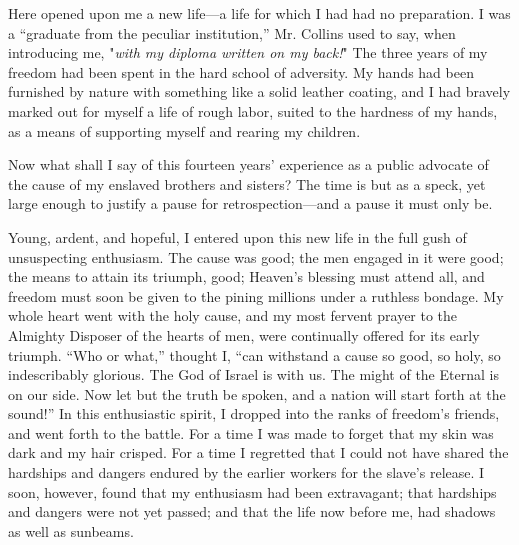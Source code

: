 Here opened upon me a new life---a life for which I had had no
preparation. I was a ``graduate from the peculiar institution,'' Mr.
Collins used to say, when introducing me, "\emph{with my diploma written
on my back!}" The three years of my freedom had been spent in the hard
school of adversity. My hands had been furnished by nature with
something like a solid leather coating, and I had bravely marked out for
myself a life of rough labor, suited to the hardness of my hands, as a
means of supporting myself and rearing my children.

Now what shall I say of this fourteen years' experience as a public
advocate of the cause of my enslaved brothers and sisters? The time is
but as a speck, yet large enough to justify a pause for
retrospection---and a pause it must only be.

Young, ardent, and hopeful, I entered upon this new life in the full
gush of unsuspecting enthusiasm. The cause was good; the men engaged in
it were {\protect\hypertarget{360}{}{}}good; the means to attain its
triumph, good; Heaven's blessing must attend all, and freedom must soon
be given to the pining millions under a ruthless bondage. My whole heart
went with the holy cause, and my most fervent prayer to the Almighty
Disposer of the hearts of men, were continually offered for its early
triumph. ``Who or what,'' thought I, ``can withstand a cause so good, so
holy, so indescribably glorious. The God of Israel is with us. The might
of the Eternal is on our side. Now let but the truth be spoken, and a
nation will start forth at the sound!'' In this enthusiastic spirit, I
dropped into the ranks of freedom's friends, and went forth to the
battle. For a time I was made to forget that my skin was dark and my
hair crisped. For a time I regretted that I could not have shared the
hardships and dangers endured by the earlier workers for the slave's
release. I soon, however, found that my enthusiasm had been extravagant;
that hardships and dangers were not yet passed; and that the life now
before me, had shadows as well as sunbeams.

